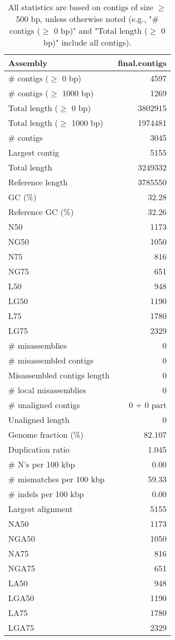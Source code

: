 \documentclass[12pt,a4paper]{article}
\begin{document}
\begin{table}[ht]
\begin{center}
\caption{All statistics are based on contigs of size $\geq$ 500 bp, unless otherwise noted (e.g., "\# contigs ($\geq$ 0 bp)" and "Total length ($\geq$ 0 bp)" include all contigs).}
\begin{tabular}{|l*{1}{|r}|}
\hline
Assembly & final.contigs \\ \hline
\# contigs ($\geq$ 0 bp) & 4597 \\ \hline
\# contigs ($\geq$ 1000 bp) & 1269 \\ \hline
Total length ($\geq$ 0 bp) & 3802915 \\ \hline
Total length ($\geq$ 1000 bp) & 1974481 \\ \hline
\# contigs & 3045 \\ \hline
Largest contig & 5155 \\ \hline
Total length & 3249332 \\ \hline
Reference length & 3785550 \\ \hline
GC (\%) & 32.28 \\ \hline
Reference GC (\%) & 32.26 \\ \hline
N50 & 1173 \\ \hline
NG50 & 1050 \\ \hline
N75 & 816 \\ \hline
NG75 & 651 \\ \hline
L50 & 948 \\ \hline
LG50 & 1190 \\ \hline
L75 & 1780 \\ \hline
LG75 & 2329 \\ \hline
\# misassemblies & 0 \\ \hline
\# misassembled contigs & 0 \\ \hline
Misassembled contigs length & 0 \\ \hline
\# local misassemblies & 0 \\ \hline
\# unaligned contigs & 0 + 0 part \\ \hline
Unaligned length & 0 \\ \hline
Genome fraction (\%) & 82.107 \\ \hline
Duplication ratio & 1.045 \\ \hline
\# N's per 100 kbp & 0.00 \\ \hline
\# mismatches per 100 kbp & 59.33 \\ \hline
\# indels per 100 kbp & 0.00 \\ \hline
Largest alignment & 5155 \\ \hline
NA50 & 1173 \\ \hline
NGA50 & 1050 \\ \hline
NA75 & 816 \\ \hline
NGA75 & 651 \\ \hline
LA50 & 948 \\ \hline
LGA50 & 1190 \\ \hline
LA75 & 1780 \\ \hline
LGA75 & 2329 \\ \hline
\end{tabular}
\end{center}
\end{table}
\end{document}
